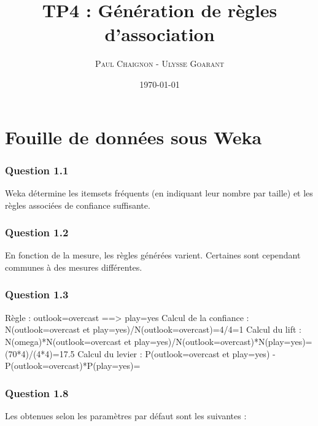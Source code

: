 \documentclass[a4paper,12pt]{article}
\title{TP4 : Génération de règles d'association}
\author{\textsc{Paul Chaignon} - \textsc{Ulysse Goarant}}
\date{\today}
\begin{document}
\maketitle

\section{Fouille de données sous Weka}


\subsubsection*{Question 1.1}
Weka détermine les itemsets fréquents (en indiquant leur nombre par taille) et les règles associées de confiance suffisante.

\subsubsection*{Question 1.2}
En fonction de la mesure, les règles générées varient. Certaines sont cependant communes à des mesures différentes.

\subsubsection*{Question 1.3}
Règle : outlook=overcast ==> play=yes
Calcul de la confiance : N(outlook=overcast et play=yes)/N(outlook=overcast)=4/4=1
Calcul du lift : N(omega)*N(outlook=overcast et play=yes)/N(outlook=overcast)*N(play=yes)=(70*4)/(4*4)=17.5
Calcul du levier : P(outlook=overcast et play=yes) - P(outlook=overcast)*P(play=yes)=

\subsubsection{Question 1.8}
Les obtenues selon les paramètres par défaut sont les suivantes :
\end{document}
